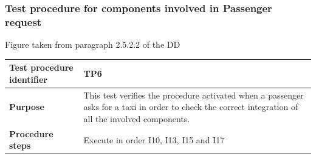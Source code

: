\documentclass[a4paper,11pt]{report} %
\begin{document}
			\subsubsection{Test procedure for components involved in Passenger request}
				\begin{minipage}{\linewidth}
				\end{minipage}
				\begin{center}
					Figure taken from paragraph 2.5.2.2 of the DD
				\end{center} 			
				\begin{center}
					\begin{tabular}{| l | p{9.5cm} |}\hline
						\textbf{Test procedure identifier} & TP6\\\hline
												\textbf{Purpose} & This test verifies the procedure activated when a passenger asks for a taxi in order to check the correct integration of all the involved components.\\\hline
												\textbf{Procedure steps} & Execute in order I10, I13, I15 and I17 \\\hline
					\end{tabular}
				\end{center}			
		\pagebreak				
\end{document}

